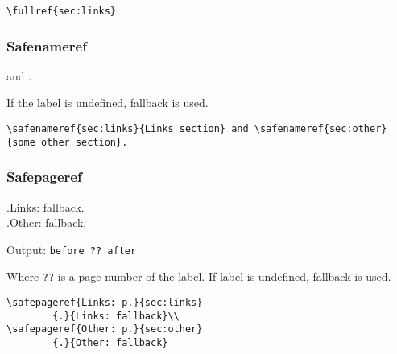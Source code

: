 \documentclass[itdr]{subfiles}
\begin{document}

\begin{lstlisting}
\fullref{sec:links}
\end{lstlisting}

\subsubsection{Safenameref}

 and .

If the label is undefined, fallback is used.

\begin{lstlisting}
\safenameref{sec:links}{Links section} and \safenameref{sec:other}{some other section}.
\end{lstlisting}

\subsubsection{Safepageref}

	{.}{Links: fallback.}\\
	{.}{Other: fallback.}

Output: \lstinline!before ?? after!

Where \lstinline!??! is a page number of the label. If label is undefined, fallback is used.

\begin{lstlisting}
\safepageref{Links: p.}{sec:links}
		{.}{Links: fallback}\\
\safepageref{Other: p.}{sec:other}
		{.}{Other: fallback}
\end{lstlisting}

\cleartoleftpage
\end{document}
